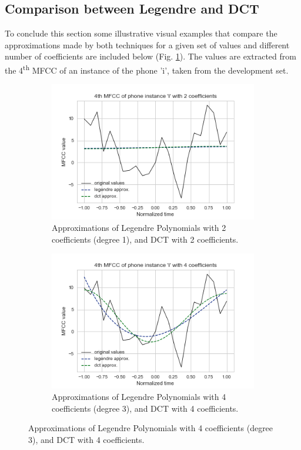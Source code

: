\subsection{Comparison between Legendre and DCT}

To conclude this section some illustrative visual examples that compare the approximations made
by both techniques for a given set of values and different number of coefficients
are included below (Fig. \ref{fig:dynamic_features_2}).
The values are extracted from
the 4\textsuperscript{th} MFCC of an instance of the phone 'i', taken from the development set.

\begin{figure}[H]
  \centering
  \begin{subfigure}{.5\textwidth}
    \centering
    \captionsetup{width=.95\linewidth}
    \includegraphics[width=.95\linewidth]{files/figures/method/dynamic_features_2}
    \caption{Approximations of Legendre Polynomials with 2 coefficients (degree 1),
    and DCT with 2 coefficients.}
    \label{fig:dynamic_features_2}
  \end{subfigure}%
  \begin{subfigure}{.5\textwidth}
    \centering
    \captionsetup{width=.95\linewidth}
    \includegraphics[width=.95\linewidth]{files/figures/method/dynamic_features_4}
    \caption{Approximations of Legendre Polynomials with 4 coefficients (degree 3),
    and DCT with 4 coefficients.}
    \label{fig:dynamic_features_4}
  \end{subfigure}
\end{figure}

